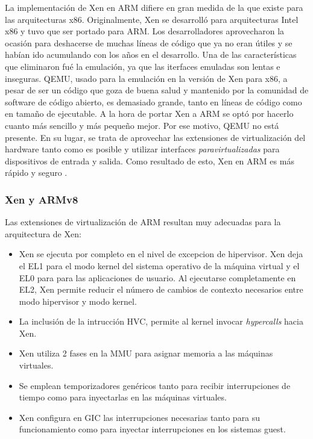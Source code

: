La implementación de Xen en ARM difiere en gran medida de la que existe para las arquitecturas x86. Originalmente, Xen se desarrolló para arquitecturas Intel x86 y tuvo que ser portado para ARM. Los desarrolladores aprovecharon la ocasión para deshacerse de muchas líneas de código que ya no eran útiles y se habían ido acumulando con los años en el desarrollo. Una de las características que eliminaron fué la emulación, ya que las iterfaces emuladas son lentas e inseguras. QEMU, usado para la emulación en la versión de Xen para x86, a pesar de ser un código que goza de buena salud y mantenido por la comunidad de software de código abierto, es demasiado grande, tanto en líneas de código como en tamaño de ejecutable. A la hora de portar Xen a ARM se optó por hacerlo cuanto más sencillo y más pequeño mejor. Por ese motivo, QEMU no está presente. En su lugar, se trata de aprovechar las extensiones de virtualización del hardware tanto como es posible y utilizar interfaces \textit{paravirtualizadas} para dispositivos de entrada y salida. Como resultado de esto, Xen en ARM es más rápido y seguro \cite{xen_arm_whitepaper}.

\subsubsection{Xen y ARMv8}

Las extensiones de virtualización de ARM resultan muy adecuadas para la arquitectura de Xen:
\begin{itemize}
  \item Xen se ejecuta por completo en el nivel de excepcion de hipervisor.  Xen deja el EL1 para el modo kernel del sistema operativo de la máquina virtual y el EL0 para para las aplicaciones de usuario. Al ejecutarse completamente en EL2, Xen permite reducir el número de cambios de contexto necesarios entre modo hipervisor y modo kernel.
  \item La inclusión de la intrucción HVC, permite al kernel invocar \textit{hypercalls} hacia Xen.
  \item Xen utiliza 2 fases en la \acrshort{MMU} para asignar memoria a las máquinas virtuales.
  \item Se emplean temporizadores genéricos tanto para recibir interrupciones de tiempo como para inyectarlas en las máquinas virtuales.
  \item Xen configura en GIC las interrupciones necesarias tanto para su funcionamiento como para inyectar interrupciones en los sistemas guest.
\end{itemize}

